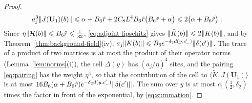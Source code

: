 \documentclass[11pt]{preprint}
\DeclarePairedDelimiter{\norm}{\lVert}{\rVert}
\numberwithin{equation}{section}
\begin{document}
\begin{proof}
\[
    a_j^3\norm{J(\mathbf U_1)(b)} \leqslant \alpha + B_6\hat r + 2C_8L^4B_6\hat r\bigl(B_6\hat r + \alpha\bigr) \leqslant 2\bigl(\alpha + B_6\hat r\bigr)\;.
\]
Since $\eta\norm{\mathcal H(b)} \leqslant B_6\hat r \leqslant \frac{1}{32}$, \eqref{eq:adjoint-lipschitz} gives $\norm{\tilde K(b)} \leqslant 2\norm{K(b)}$, and by Theorem~\ref{thm:background-field}(iv), $a_j\norm{K(b)} \leqslant B_6e^{-\delta_2d(y, c'_-)}\norm{\delta(c')}$. The trace of a product of two matrices is at most the product of their operator norms (Lemma~\ref{lem:norms}(i)), the cell $\Delta(y)$ has $(a_j/\eta)^4$ sites, and the pairing \eqref{eq:pairing} has the weight $\eta^4$, so that the contribution of the cell to $\langle\tilde K, J(\mathbf U_1)\rangle$ is at most $16B_6(\alpha + B_6\hat r)e^{-\delta_2d(y, c'_-)}\norm{\delta(c')}$. The sum over $y$ is at most $c_1(\frac{1}{2}, \delta_2)$ times the factor in front of the exponential, by \eqref{eq:summation}.


\end{proof}
\end{document}
